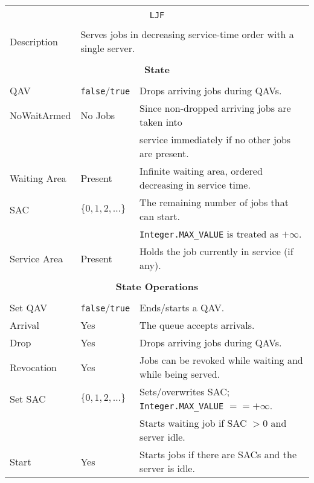 \documentclass[12pt]{book}
\begin{document}
\begin{tabular}{|l|l|l|}
\hline
\multicolumn{3}{|c|}{} \\
\multicolumn{3}{|c|}{\lstinline[basicstyle=\large]{LJF}} \\
\multicolumn{3}{|c|}{} \\
\hline
Description & \multicolumn{2}{|l|}{Serves jobs in decreasing service-time order with a single server.} \\
\hline
\multicolumn{3}{|c|}{} \\
\multicolumn{3}{|c|}{\bf State} \\
\multicolumn{3}{|c|}{} \\
\hline
QAV & \lstinline|false|/\lstinline|true| & Drops arriving jobs during QAVs. \\
\hline
NoWaitArmed & No Jobs & Since non-dropped arriving jobs are taken into \\
            &         & service immediately if no other jobs are present. \\
\hline
Waiting Area & Present & Infinite waiting area, ordered decreasing in service time. \\
\hline
SAC & $\{0, 1, 2, \ldots\}$ & The remaining number of jobs that can start. \\
    &                       & \lstinline|Integer.MAX_VALUE| is treated as $+\infty$. \\
\hline
Service Area & Present & Holds the job currently in service (if any). \\
\hline
\multicolumn{3}{|c|}{} \\
\multicolumn{3}{|c|}{\bf State Operations} \\
\multicolumn{3}{|c|}{} \\
\hline
Set QAV & \lstinline|false|/\lstinline|true| & Ends/starts a QAV. \\
\hline
Arrival & Yes & The queue accepts arrivals. \\
\hline
Drop & Yes & Drops arriving jobs during QAVs. \\
\hline
Revocation & Yes & Jobs can be revoked while waiting and while being served. \\
\hline
Set SAC & $\{0, 1, 2, \ldots\}$ & Sets/overwrites SAC; \lstinline|Integer.MAX_VALUE| $== +\infty$. \\
        &                       & Starts waiting job if SAC $> 0$ and server idle. \\
\hline
Start & Yes & Starts jobs if there are SACs and the server is idle. \\
\hline

\end{tabular}
\end{document}
